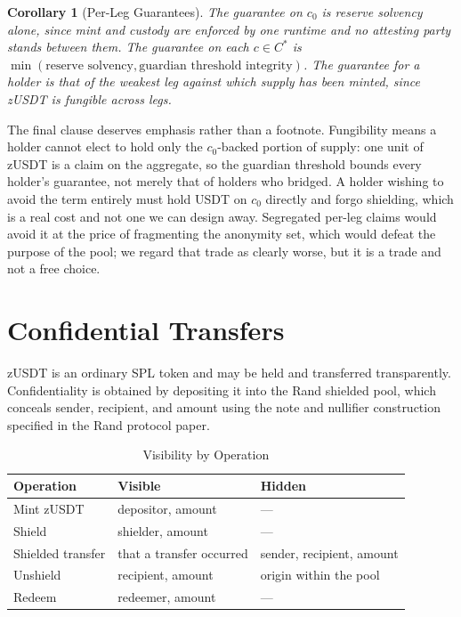 \documentclass[11pt,a4paper]{article}
\newtheorem{corollary}[theorem]{Corollary}
\begin{document}
\begin{corollary}[Per-Leg Guarantees]
\label{cor:perleg}
The guarantee on $c_0$ is reserve solvency alone, since mint and custody are enforced by one runtime and no attesting party stands between them. The guarantee on each $c \in C^{*}$ is $\min(\text{reserve solvency}, \text{guardian threshold integrity})$. The guarantee for a holder is that of the weakest leg against which supply has been minted, since zUSDT is fungible across legs.
\end{corollary}

The final clause deserves emphasis rather than a footnote. Fungibility means a holder cannot elect to hold only the $c_0$-backed portion of supply: one unit of zUSDT is a claim on the aggregate, so the guardian threshold bounds every holder's guarantee, not merely that of holders who bridged. A holder wishing to avoid the term entirely must hold USDT on $c_0$ directly and forgo shielding, which is a real cost and not one we can design away. Segregated per-leg claims would avoid it at the price of fragmenting the anonymity set, which would defeat the purpose of the pool; we regard that trade as clearly worse, but it is a trade and not a free choice.

\section{Confidential Transfers}

zUSDT is an ordinary SPL token and may be held and transferred transparently. Confidentiality is obtained by depositing it into the Rand shielded pool, which conceals sender, recipient, and amount using the note and nullifier construction specified in the Rand protocol paper.

\begin{table}[H]
\centering
\caption{Visibility by Operation}
\begin{tabular}{@{}lll@{}}
\toprule
\textbf{Operation} & \textbf{Visible} & \textbf{Hidden} \\ \midrule
Mint zUSDT & depositor, amount & --- \\
Shield & shielder, amount & --- \\
Shielded transfer & that a transfer occurred & sender, recipient, amount \\
Unshield & recipient, amount & origin within the pool \\
Redeem & redeemer, amount & --- \\ \bottomrule
\end{tabular}
\end{table}
\end{document}
